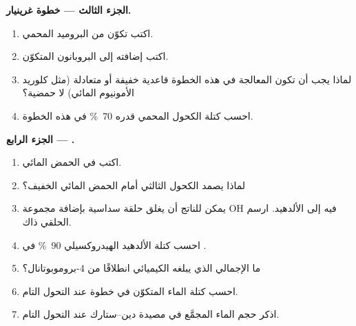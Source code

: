 \begin{problem}
\medskip
\noindent\textbf{الجزء الثالث --- خطوة غرينيار.}
\begin{enumerate}[resume]
  \item اكتب تكوّن  من البروميد
        المحمي.
  \item اكتب إضافته إلى البروبانون  المتكوّن.
  \item لماذا يجب أن تكون المعالجة في هذه الخطوة قاعدية خفيفة أو متعادلة (مثل
        كلوريد الأمونيوم المائي) لا حمضية؟
  \item احسب كتلة الكحول المحمي  قدره \qty{70}{\percent}
        في هذه الخطوة.
\end{enumerate}

\medskip
\noindent\textbf{الجزء الرابع --- .}
\begin{enumerate}[resume]
  \item اكتب  في الحمض المائي.
  \item لماذا يصمد الكحول الثالثي أمام الحمض المائي الخفيف؟
  \item يمكن للناتج أن يغلق حلقة سداسية بإضافة مجموعة OH فيه إلى
        الألدهيد. ارسم  الحلقي ذاك.
  \item احسب كتلة الألدهيد الهيدروكسيلي  \qty{90}{\percent} في
        .
  \item ما  الإجمالي الذي يبلغه الكيميائي انطلاقًا من 4-بروموبوتانال؟
  \item احسب كتلة الماء المتكوّن في خطوة  عند التحول
        التام.
  \item اذكر حجم الماء المجمَّع في مصيدة دين--ستارك عند التحول
        التام.
\end{enumerate}
\end{problem}
